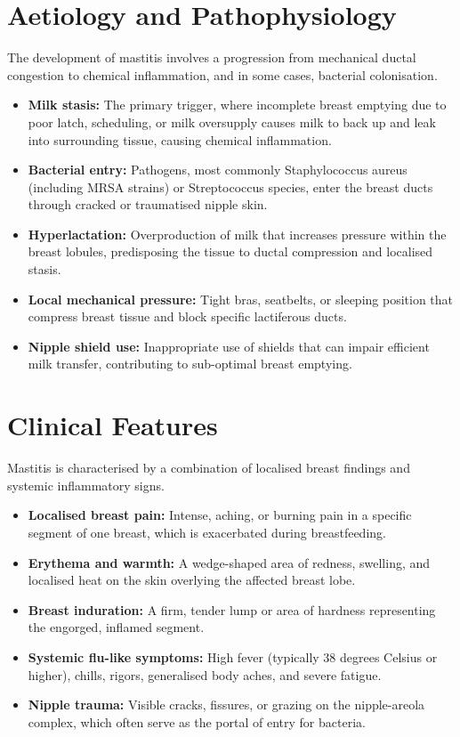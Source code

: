 \section*{Aetiology and Pathophysiology}
The development of mastitis involves a progression from mechanical ductal congestion to chemical inflammation, and in some cases, bacterial colonisation.
\begin{itemize}
    \item \textbf{Milk stasis:} The primary trigger, where incomplete breast emptying due to poor latch, scheduling, or milk oversupply causes milk to back up and leak into surrounding tissue, causing chemical inflammation.
    \item \textbf{Bacterial entry:} Pathogens, most commonly Staphylococcus aureus (including MRSA strains) or Streptococcus species, enter the breast ducts through cracked or traumatised nipple skin.
    \item \textbf{Hyperlactation:} Overproduction of milk that increases pressure within the breast lobules, predisposing the tissue to ductal compression and localised stasis.
    \item \textbf{Local mechanical pressure:} Tight bras, seatbelts, or sleeping position that compress breast tissue and block specific lactiferous ducts.
    \item \textbf{Nipple shield use:} Inappropriate use of shields that can impair efficient milk transfer, contributing to sub-optimal breast emptying.
\end{itemize}

\section*{Clinical Features}
Mastitis is characterised by a combination of localised breast findings and systemic inflammatory signs.
\begin{itemize}
    \item \textbf{Localised breast pain:} Intense, aching, or burning pain in a specific segment of one breast, which is exacerbated during breastfeeding.
    \item \textbf{Erythema and warmth:} A wedge-shaped area of redness, swelling, and localised heat on the skin overlying the affected breast lobe.
    \item \textbf{Breast induration:} A firm, tender lump or area of hardness representing the engorged, inflamed segment.
    \item \textbf{Systemic flu-like symptoms:} High fever (typically 38 degrees Celsius or higher), chills, rigors, generalised body aches, and severe fatigue.
    \item \textbf{Nipple trauma:} Visible cracks, fissures, or grazing on the nipple-areola complex, which often serve as the portal of entry for bacteria.
\end{itemize}

